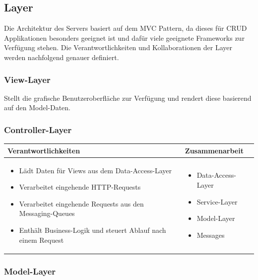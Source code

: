 \subsection{Layer}

Die Architektur des Servers basiert auf dem MVC Pattern, da dieses für CRUD Applikationen besonders geeignet ist und dafür viele geeignete Frameworks zur Verfügung stehen. %
Die Verantwortlichkeiten und Kollaborationen der Layer werden nachfolgend genauer definiert.


\subsubsection{View-Layer}

Stellt die grafische Benutzeroberfläche zur Verfügung und rendert diese basierend auf den Model-Daten.

\subsubsection{Controller-Layer}

\begin{tabular}{|p{}|p{}|} \hline
	\textbf{Verantwortlichkeiten} & \textbf{Zusammenarbeit} \\ \hline \hline
	
	\begin{itemize}
		\item Lädt Daten für Views aus dem Data-Access-Layer
		\item Verarbeitet eingehende HTTP-Requests
		\item Verarbeitet eingehende Requests aus den Messaging-Queues
		\item Enthält Business-Logik und steuert Ablauf nach einem Request	
	\end{itemize}&
	\begin{itemize}
		\item Data-Access-Layer
		\item Service-Layer
		\item Model-Layer
		\item Messages
	\end{itemize}
	\\ \hline
\end{tabular}

\subsubsection{Model-Layer}

